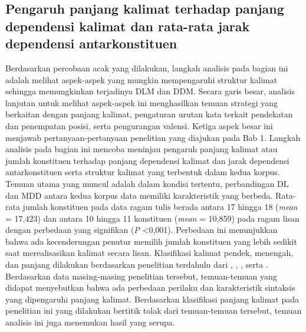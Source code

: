 \subsection{Pengaruh panjang kalimat terhadap panjang dependensi kalimat dan rata-rata jarak dependensi antarkonstituen}
Berdasarkan percobaan acak yang dilakukan, langkah analisis pada bagian ini adalah melihat aspek-aspek yang mungkin mempengaruhi struktur kalimat sehingga memungkinkan terjadinya DLM dan DDM. Secara garis besar, analisis lanjutan untuk melihat aspek-aspek ini menghasilkan temuan strategi yang berkaitan dengan panjang kalimat, pengaturan urutan kata terkait pendekatan dan penempatan posisi, serta pengurangan valensi. Ketiga aspek besar ini menjawab pertanyaan-pertanyaan penelitian yang diajukan pada Bab 1. Langkah analisis pada bagian ini mencoba meninjau pengaruh panjang kalimat atau jumlah konstituen terhadap panjang dependensi kalimat dan jarak dependensi antarkonstituen serta struktur kalimat yang terbentuk dalam kedua korpus. Temuan utama yang muncul adalah dalam kondisi tertentu, perbandingan DL dan MDD antara kedua korpus data memiliki karakteristik yang berbeda. Rata-rata jumlah konstituen pada data ragam tulis berada antara 17 hingga 18 (\textit{mean} = 17,423) dan antara 10 hingga 11 konstituen (\textit{mean} = 10,859) pada ragam lisan dengan perbedaan yang signifikan (\textit{P} \textless 0,001). Perbedaan ini menunjukkan bahwa ada kecenderungan penutur memilih jumlah konstituen yang lebih sedikit saat merealisasikan kalimat secara lisan. Klasifikasi kalimat pendek, menengah, dan panjang dilakukan berdasarkan penelitian terdahulu dari \cite{gildea2015human}, \cite{futrell2015large}, \cite{wang2017effects}, serta \cite{liu2017dependency}. Berdasarkan data masing-masing penelitian tersebut, temuan-temuan yang didapat menyebutkan bahwa ada perbedaan perilaku dan karakteristik sintaksis yang dipengaruhi panjang kalimat. Berdasarkan klasifikasi panjang kalimat pada penelitian ini yang dilakukan bertitik tolak dari temuan-temuan tersebut, temuan analisis ini juga menemukan hasil yang serupa. 

